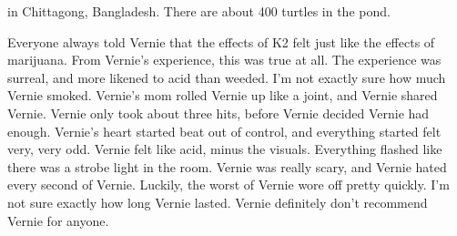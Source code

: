 \documentclass[12pt]{book}
\begin{document}
in Chittagong, Bangladesh. There are about 400 turtles in the pond.



Everyone always told Vernie that the effects of K2 felt just like the effects of marijuana. From Vernie's experience, this was true at all. The experience was surreal, and more likened to acid than weeded. I'm not exactly sure how much Vernie smoked. Vernie's mom rolled Vernie up like a joint, and Vernie shared Vernie. Vernie only took about three hits, before Vernie decided Vernie had enough. Vernie's heart started beat out of control, and everything started felt very, very odd. Vernie felt like acid, minus the visuals. Everything flashed like there was a strobe light in the room. Vernie was really scary, and Vernie hated every second of Vernie. Luckily, the worst of Vernie wore off pretty quickly. I'm not sure exactly how long Vernie lasted. Vernie definitely don't recommend Vernie for anyone.
\end{document}
